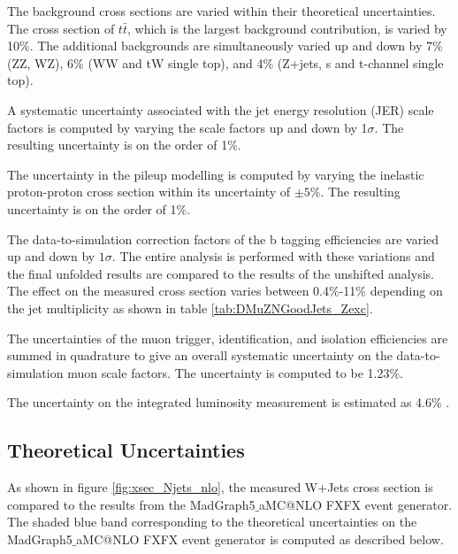 \documentclass[oneside, letterpaper, oldfontcommands]{memoir}
\begin{document}
\begin{table}
\qquad The background cross sections are varied within their theoretical uncertainties. The cross section of $t\bar{t}$, which is the largest background contribution, is varied by 10\%. The additional backgrounds are simultaneously varied up and down by 7\% (ZZ, WZ), 6\% (WW and tW single top), and 4\% (Z+jets, s and t-channel single top). 


\qquad A systematic uncertainty associated with the jet energy resolution (JER) scale factors is computed by varying the scale factors up and down by 1$\sigma$. The resulting uncertainty is on the order of 1\%.

\qquad The uncertainty in the pileup modelling is computed by varying the inelastic proton-proton cross section within its uncertainty of $\pm 5\%$. The resulting uncertainty is on the order of 1\%.

\qquad The data-to-simulation correction factors of the b tagging efficiencies are varied up and down by $1 \sigma$. The entire analysis is performed with these variations and the final unfolded results are compared to the results of the unshifted analysis. The effect on the measured cross section varies between 0.4\%-11\% depending on the jet multiplicity as shown in table \ref{tab:DMuZNGoodJets_Zexc}.

\qquad The uncertainties of the muon trigger, identification, and isolation efficiencies are summed in quadrature to give an overall systematic uncertainty on the data-to-simulation muon scale factors. The uncertainty is computed to be 1.23\%.

\qquad The uncertainty on the integrated luminosity measurement is estimated as 4.6\% \cite{CMS-PAS-LUM-15-001}.

\subsection{Theoretical Uncertainties}
\qquad As shown in figure \ref{fig:xsec_Njets_nlo}, the measured W+Jets cross section is compared to the results from the {\sc MadGraph5$\_$aMC@NLO} FXFX event generator. The shaded blue band corresponding to the theoretical uncertainties on the {\sc MadGraph5$\_$aMC@NLO} FXFX event generator is computed as described below.


\end{table}
\end{document}
